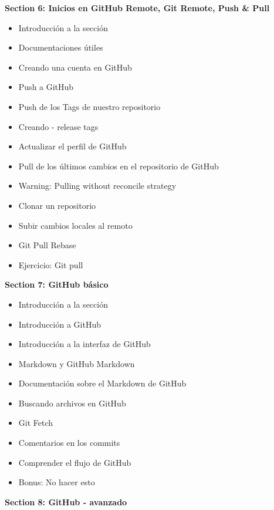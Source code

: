 \documentclass[
]{book}
\providecommand{\tightlist}{%
  \setlength{\itemsep}{0pt}\setlength{\parskip}{0pt}}
\begin{document}
\textbf{Section 6: Inicios en GitHub Remote, Git Remote, Push \& Pull}

\begin{itemize}
\tightlist
\item
  Introducción a la sección
\item
  Documentaciones útiles
\item
  Creando una cuenta en GitHub
\item
  Push a GitHub
\item
  Push de los Tags de nuestro repositorio
\item
  Creando - release tags
\item
  Actualizar el perfil de GitHub
\item
  Pull de los últimos cambios en el repositorio de GitHub
\item
  Warning: Pulling without reconcile strategy
\item
  Clonar un repositorio
\item
  Subir cambios locales al remoto
\item
  Git Pull Rebase
\item
  Ejercicio: Git pull
\end{itemize}

\textbf{Section 7: GitHub básico}

\begin{itemize}
\tightlist
\item
  Introducción a la sección
\item
  Introducción a GitHub
\item
  Introducción a la interfaz de GitHub
\item
  Markdown y GitHub Markdown
\item
  Documentación sobre el Markdown de GitHub
\item
  Buscando archivos en GitHub
\item
  Git Fetch
\item
  Comentarios en los commits
\item
  Comprender el flujo de GitHub
\item
  Bonus: No hacer esto
\end{itemize}

\textbf{Section 8: GitHub - avanzado}
\end{document}
